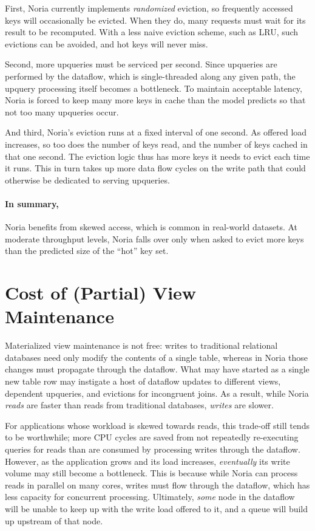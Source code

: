 First, Noria currently implements \emph{randomized} eviction, so frequently
accessed keys will occasionally be evicted. When they do, many requests must
wait for its result to be recomputed. With a less naive eviction scheme, such as
LRU, such evictions can be avoided, and hot keys will never miss.

Second, more upqueries must be serviced per second. Since upqueries are
performed by the dataflow, which is single-threaded along any given path, the
upquery processing itself becomes a bottleneck. To maintain acceptable latency,
Noria is forced to keep many more keys in cache than the model predicts so that
not too many upqueries occur.

And third, Noria's eviction runs at a fixed interval of one second. As offered
load increases, so too does the number of keys read, and the number of keys
cached in that one second. The eviction logic thus has more keys it needs to
evict each time it runs. This in turn takes up more data flow cycles on the
write path that could otherwise be dedicated to serving upqueries.

\paragraph{In summary,} Noria benefits from skewed access, which is common in
real-world datasets. At moderate throughput levels, Noria falls over only when
asked to evict more keys than the predicted size of the ``hot'' key set.

\section{Cost of (Partial) View Maintenance}

Materialized view maintenance is not free: writes to traditional relational
databases need only modify the contents of a single table, whereas in
Noria those changes must propagate through the dataflow. What may have started
as a single new table row may instigate a host of dataflow updates to different
views, dependent upqueries, and evictions for incongruent joins. As a result,
while Noria \emph{reads} are faster than reads from traditional databases,
\emph{writes} are slower.

For applications whose workload is skewed towards reads, this trade-off still
tends to be worthwhile; more CPU cycles are saved from not repeatedly
re-executing queries for reads than are consumed by processing writes through
the dataflow. However, as the application grows and its load increases,
\emph{eventually} its write volume may still become a bottleneck. This is
because while Noria can process reads in parallel on many cores, writes must
flow through the dataflow, which has less capacity for concurrent processing.
Ultimately, \emph{some} node in the dataflow will be unable to keep up with the
write load offered to it, and a queue will build up upstream of that node.

